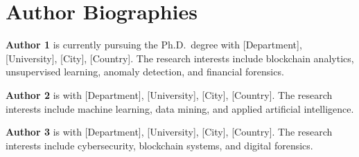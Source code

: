 \documentclass{ieeeaccess}
\begin{document}
\section*{Author Biographies}

\noindent\textbf{Author 1} is currently pursuing the Ph.D.\ degree with [Department], [University], [City], [Country]. The research interests include blockchain analytics, unsupervised learning, anomaly detection, and financial forensics.

\medskip
\noindent\textbf{Author 2} is with [Department], [University], [City], [Country]. The research interests include machine learning, data mining, and applied artificial intelligence.

\medskip
\noindent\textbf{Author 3} is with [Department], [University], [City], [Country]. The research interests include cybersecurity, blockchain systems, and digital forensics.
\end{document}
